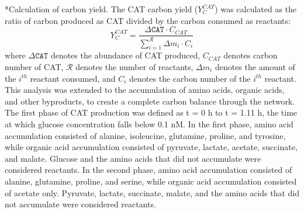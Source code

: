 \documentclass[12pt]{article}
\makeatletter
\renewcommand\subsection{\@startsection
	{subsection}{2}{0mm}
	{-0.05in}
	{-0.5\baselineskip}
	{\normalfont\normalsize\bfseries}}
\makeatother
\begin{document}
\subsection*{Calculation of carbon yield.}
The CAT carbon yield ($Y_{C}^{CAT}$) was calculated as the ratio of carbon produced as CAT divided by the carbon consumed as reactants:
\begin{equation}\label{eqn:yield-definition}
	Y_{C}^{CAT}=\frac{\Delta\texttt{CAT}\cdot C_{CAT}}{\displaystyle\sum_{i=1}^{\mathcal{R}}\Delta m_{i}\cdot C_i}
\end{equation}
where $\Delta\texttt{CAT}$ denotes the abundance of CAT produced, $C_{CAT}$ denotes carbon number of CAT, $\mathcal{R}$ denotes the number of reactants, $\Delta m_{i}$ denotes the amount of the $i^{th}$ reactant consumed, and $C_i$ denotes the carbon number of the $i^{th}$ reactant.
This analysis was extended to the accumulation of amino acids, organic acids, and other byproducts, to create a complete carbon balance through the network.
The first phase of CAT production was defined as t = 0 h to t = 1.11 h, the time at which glucose concentration falls below 0.1 nM.
In the first phase, amino acid accumulation consisted of alanine, isoleucine, glutamine, proline, and tyrosine, while organic acid accumulation consisted of pyruvate, lactate, acetate, succinate, and malate.
Glucose and the amino acids that did not accumulate were considered reactants.
In the second phase, amino acid accumulation consisted of alanine, glutamine, proline, and serine, while organic acid accumulation consisted of acetate only.
Pyruvate, lactate, succinate, malate, and the amino acids that did not accumulate were considered reactants.
\end{document}
